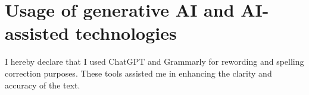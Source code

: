 \section{Usage of generative AI and AI-assisted technologies}
\label{sec:usage_AI}

I hereby declare that I used ChatGPT and Grammarly for rewording and spelling correction purposes. 
These tools assisted me in enhancing the clarity and accuracy of the text.